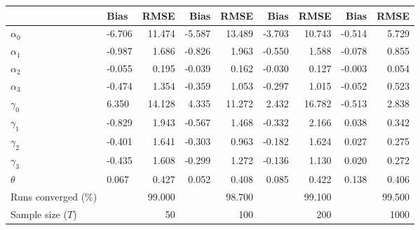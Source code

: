 
\begin{tabular}[t]{llrrrrrrr}
\toprule
  & Bias & RMSE & Bias & RMSE & Bias & RMSE & Bias & RMSE\\
\midrule
$\alpha_{0}$ & -6.706 & 11.474 & -5.587 & 13.489 & -3.703 & 10.743 & -0.514 & 5.729\\
$\alpha_{1}$ & -0.987 & 1.686 & -0.826 & 1.963 & -0.550 & 1.588 & -0.078 & 0.855\\
$\alpha_{2}$ & -0.055 & 0.195 & -0.039 & 0.162 & -0.030 & 0.127 & -0.003 & 0.054\\
$\alpha_{3}$ & -0.474 & 1.354 & -0.359 & 1.053 & -0.297 & 1.015 & -0.052 & 0.523\\
$\gamma_{0}$ & 6.350 & 14.128 & 4.335 & 11.272 & 2.432 & 16.782 & -0.513 & 2.838\\
$\gamma_{1}$ & -0.829 & 1.943 & -0.567 & 1.468 & -0.332 & 2.166 & 0.038 & 0.342\\
$\gamma_{2}$ & -0.401 & 1.641 & -0.303 & 0.963 & -0.182 & 1.624 & 0.027 & 0.275\\
$\gamma_{3}$ & -0.435 & 1.608 & -0.299 & 1.272 & -0.136 & 1.130 & 0.020 & 0.272\\
$\theta$ & 0.067 & 0.427 & 0.052 & 0.408 & 0.085 & 0.422 & 0.138 & 0.406\\
Runs converged (\%) &  & 99.000 &  & 98.700 &  & 99.100 &  & 99.500\\
Sample size ($T$) &  & 50 &  & 100 &  & 200 &  & 1000\\
\bottomrule
\end{tabular}
